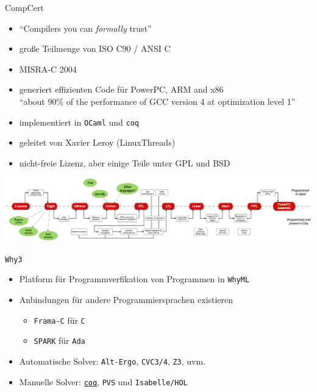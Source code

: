 \documentclass[aspectratio=169]{beamer}
\begin{document}
\begin{frame}
  \begin{center}
    \Large{CompCert}
  \end{center}
  \begin{itemize}
  \item ``Compilers you can \textit{formally} trust''
  \item große Teilmenge von ISO C90 / ANSI C
  \item MISRA-C 2004
  \item generiert effizienten Code für PowerPC, ARM and x86\\
    ``about 90\% of the performance of GCC version 4 at optimization level 1''
  \item implementiert in \texttt{OCaml} und \texttt{coq}
  \item geleitet von Xavier Leroy (LinuxThreads) 
  \item nicht-freie Lizenz, aber einige Teile unter GPL und BSD
  \end{itemize}
\end{frame}
\begin{frame}
  \begin{center}
    \includegraphics[width=20.0cm]{compcert_diagram.png}
  \end{center}
\end{frame}
\begin{frame}
  \begin{center}
    \Large{\texttt{Why3}}
  \end{center}
  \begin{itemize}
  \item Platform für Programmverfikation von Programmen in \texttt{WhyML}
  \item Anbindungen für andere Programmiersprachen existieren
    \begin{itemize}
    \item \texttt{Frama-C} für \texttt{C}
    \item \texttt{SPARK} für \texttt{Ada}
    \end{itemize}
  \item Automatische Solver: \texttt{Alt-Ergo}, \texttt{CVC3/4}, \texttt{Z3}, uvm. 
  \item Manuelle Solver: \underline{\texttt{coq}}, \texttt{PVS} und \texttt{Isabelle/HOL}
  \end{itemize}
\end{frame}
\end{document}
